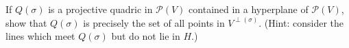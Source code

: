 If $Q(\sigma)$ is a projective quadric in $\mathcal{P}(V)$ contained in a hyperplane of $\mathcal{P}(V)$, show that $Q(\sigma)$ is precisely the set of all points in $V^{\perp(\sigma)}$. (Hint: consider the lines which meet $Q(\sigma)$ but do not lie in $H$.)

